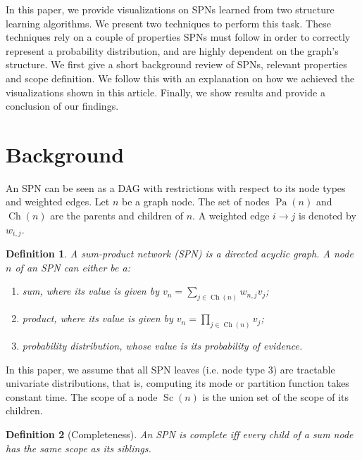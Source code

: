 \documentclass{article}
\newtheorem{definition}{Definition}
\DeclareMathOperator*{\Ch}{\text{Ch}}
\DeclareMathOperator*{\Pa}{\text{Pa}}
\DeclareMathOperator*{\Sc}{\text{Sc}}
\begin{document}
In this paper, we provide visualizations on SPNs learned from two structure learning algorithms. We
present two techniques to perform this task. These techniques rely on a couple of properties SPNs
must follow in order to correctly represent a probability distribution, and are highly dependent on
the graph's structure. We first give a short background review of SPNs, relevant properties and
scope definition. We follow this with an explanation on how we achieved the visualizations shown in
this article. Finally, we show results and provide a conclusion of our findings.


\section{Background}
\label{sec:back}

An SPN can be seen as a DAG with restrictions with respect to its node types and weighted edges.
Let $n$ be a graph node. The set of nodes $\Pa(n)$ and $\Ch(n)$ are the parents and children of
$n$. A weighted edge $i\to j$ is denoted by $w_{i,j}$.

\begin{definition}
  A sum-product network (SPN) is a directed acyclic graph. A node $n$ of an SPN can either be a:
  \begin{enumerate}\setlength\itemsep{0em}
    \item sum, where its value is given by $v_n=\sum_{j\in\Ch(n)}w_{n,j}v_j$;
    \item product, where its value is given by $v_n=\prod_{j\in\Ch(n)}v_j$;
    \item probability distribution, whose value is its probability of evidence.
  \end{enumerate}
\end{definition}

In this paper, we assume that all SPN leaves (i.e. node type 3) are tractable univariate
distributions, that is, computing its mode or partition function takes constant time. The scope of
a node $\Sc(n)$ is the union set of the scope of its children.

\begin{definition}[Completeness]
  An SPN is complete iff every child of a sum node has the same scope as its siblings.
\end{definition}
\end{document}
